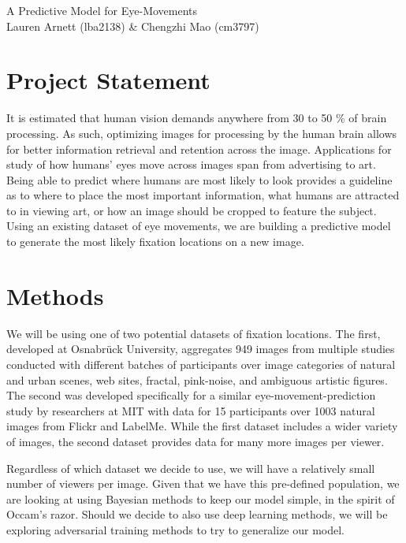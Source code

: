 \documentclass[11pt]{article}
\begin{document}
\begin{center}
    \LARGE {A Predictive Model for Eye-Movements}
    \\\large Lauren Arnett (lba2138) \& Chengzhi Mao (cm3797)
    
\end{center}
\section{Project Statement} 
\vspace{-0.25cm}
It is estimated that human vision demands anywhere from 30 to 50 \% of brain
processing. As such, optimizing images for processing by the human brain allows
for better information retrieval and retention across the image. Applications
for study of how humans' eyes move across images span from advertising to art.
Being able to predict where humans are most likely to look provides a guideline
as to where to place the most important information, what humans are attracted
to in viewing art, or how an image should be cropped to feature the subject.
Using an existing dataset of eye movements, we are building a predictive model
to generate the most likely fixation locations on a new image. 
\vspace{-0.5cm}

\section{Methods} 

\vspace{-0.25cm}
We will be using one of two potential datasets of fixation locations. The
first, developed at Osnabr{\"u}ck University, aggregates 949 images
from multiple studies conducted with different batches of participants over
image categories of natural and urban scenes, web sites, fractal, pink-noise,
and ambiguous artistic figures.  The second was developed specifically for
a similar eye-movement-prediction study by researchers at MIT with data for 15
participants over 1003 natural images from Flickr and LabelMe. While the first
dataset includes a wider variety of images, the second dataset provides data
for many more images per viewer.

Regardless of which dataset we decide to use, we will have a relatively small
number of viewers per image. Given that we have this pre-defined population, we
are looking at using Bayesian methods to keep our model simple, in the spirit
of Occam's razor. Should we decide to also use deep learning methods, we
will be exploring adversarial training methods to try to generalize our model.
\end{document}
